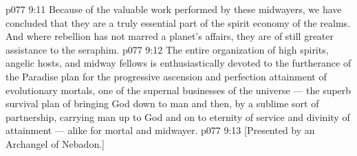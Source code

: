 \vs p077 9:11 Because of the valuable work performed by these midwayers, we have concluded that they are a truly essential part of the spirit economy of the realms. And where rebellion has not marred a planet’s affairs, they are of still greater assistance to the seraphim.
\vs p077 9:12 \pc The entire organization of high spirits, angelic hosts, and midway fellows is enthusiastically devoted to the furtherance of the Paradise plan for the progressive ascension and perfection attainment of evolutionary mortals, one of the supernal businesses of the universe --- the superb survival plan of bringing God down to man and then, by a sublime sort of partnership, carrying man up to God and on to eternity of service and divinity of attainment --- alike for mortal and midwayer.
\vsetoff
\vs p077 9:13 [Presented by an Archangel of Nebadon.]
